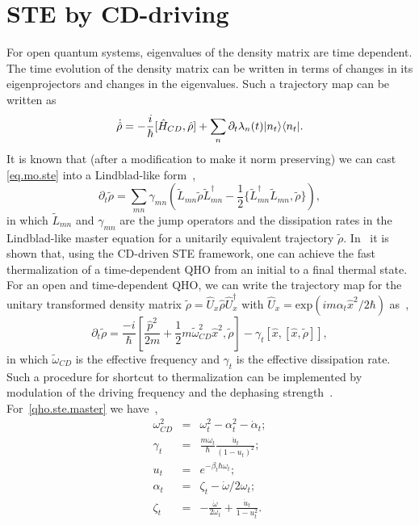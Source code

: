 \documentclass[aps,pra,twocolumn,showpacs,showkeys,groupedaddress,nobalancelastpage,nofootinbib,floatfix,superscriptaddress,longbibliography]{revtex4-2}
\begin{document}
\section{STE by CD-driving}
\label{sec:stt}
For open quantum systems, eigenvalues of the density matrix are time dependent. The time evolution of the density matrix can be written in terms of changes in its eigenprojectors and changes in the eigenvalues. Such a trajectory map can be written as
\begin{equation}\label{eq.mo.ste}
   \dot{\hat{\rho}} = -\frac{i}{\hbar}[\hat{H}_{CD},\hat{\rho}] + \sum_{n}\partial_t \lambda_n(t)|n_t\rangle\langle n_t|.
\end{equation}
It is known that (after a modification to make it norm preserving) we can cast \cref{eq.mo.ste} into a Lindblad-like form~\cite{Alipour2020shortcutsto},
\begin{equation}\label{lind.like.ste}
   \partial_t \tilde{\rho} = \sum_{mn}\gamma_{mn}(\tilde{L}_{mn} \tilde{\rho} \tilde{L}_{mn}^{\dagger} - \frac{1}{2}\{\tilde{L}_{mn}^{\dagger} \tilde{L}_{mn}, \tilde{\rho}\}),
\end{equation}
in which $\tilde{L}_{mn}$ and $\gamma_{mn}$ are the jump operators and the dissipation rates in the Lindblad-like master equation for a
unitarily equivalent trajectory $\tilde{\rho}$. In~\cite{Alipour2020shortcutsto} it is shown that, using the CD-driven STE framework, one can achieve the fast thermalization of a time-dependent QHO from an initial to a final thermal state. For an open and time-dependent QHO, we can write the trajectory map for the unitary transformed density matrix $\tilde{\rho}=\hat{U}_x \hat{\rho} \hat{U}_x^{\dagger}$ with $\hat{U}_x = \text{exp}(im\alpha_t \hat{x}^2/2\hbar)$ as~\cite{Alipour2020shortcutsto},
\begin{equation}\label{qho.ste.master}
\partial_t \tilde{\rho} = \frac{-i}{\hbar} \left[\frac{\hat{p}^2}{2m} + \frac{1}{2} m\tilde{\omega}_{CD}^2 \hat{x}^2,  \tilde{\rho}\right] - \gamma_t \left[\hat{x}, \left[\hat{x}, \tilde{\rho}\right]\right],
\end{equation}
in which $\tilde{\omega}_{CD}$ is the effective frequency and $\gamma_t$ is the effective dissipation rate. Such a procedure for shortcut to thermalization can be implemented by modulation of the driving frequency and the dephasing strength~\cite{Alipour2020shortcutsto,PhysRevResearch.2.033178}. For~\cref{qho.ste.master} we have~\cite{Alipour2020shortcutsto},
\begin{eqnarray}\label{qho.ste.param}
  \omega_{CD}^2 &=& \omega_t^2 - \alpha_t^2 - \dot{\alpha}_t; \\
  \gamma_t &=& \frac{m\omega_t}{\hbar}\frac{\dot{u}_t}{(1-u_t)^2}; \\
   u_t &=& e^{-\beta_t \hbar \omega_t}; \\
   \alpha_t &=& \zeta_t - \dot{\omega}/2\omega_t; \\
   \zeta_t &=& -\frac{\dot{\omega}}{2\omega_t} + \frac{\dot{u}_t}{1-u_t^2}.
\end{eqnarray}
\end{document}
